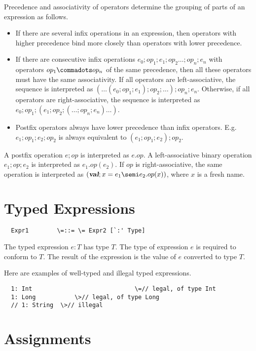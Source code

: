 \documentclass[11pt]{report}
\begin{document}
Precedence and associativity of operators determine the grouping of
parts of an expression as follows.
\begin{itemize}
\item If there are several infix operations in an
expression, then operators with higher precedence bind more closely
than operators with lower precedence.
\item If there are consecutive infix
operations $e_0;op_1;e_1;op_2\ldots;op_n;e_n$ with operators $op_1
\commadots op_n$ of the same precedence, then all these operators must
have the same associativity. If all operators are left-associative,
the sequence is interpreted as $(\ldots(e_0;op_1;e_1);op_2;\ldots);
op_n;e_n$. Otherwise, if all operators are right-associative, the
sequence is interpreted as
$e_0;op_1;(e_1;op_2;(\ldots;op_n;e_n)\ldots)$.
\item
Postfix operators always have lower precedence than infix
operators. E.g.\ $e_1;op_1;e_2;op_2$ is always equivalent to
$(e_1;op_1;e_2);op_2$.
\end{itemize}
A postfix operation $e;op$ is interpreted as $e.op$. A
left-associative binary operation $e_1;op;e_2$ is interpreted as
$e_1.op(e_2)$. If $op$ is right-associative, the same operation is
interpreted as $(\VAL;x=e_1
\semi e_2.op(x))$, where $x$ is a fresh name.

\section{Typed Expressions}

\syntax\begin{verbatim}
  Expr1	       \=::= \= Expr2 [`:' Type]
\end{verbatim}

The typed expression $e: T$ has type $T$. The type of expression $e$
is required to conform to $T$. The result of the expression is the
value of $e$ converted to type $T$.

\example Here are examples of well-typed and illegal typed expressions.

\begin{verbatim}
  1: Int                             \=// legal, of type Int
  1: Long	    	\>// legal, of type Long
  // 1: String 	\>// illegal
\end{verbatim}

\section{Assignments}
\end{document}
